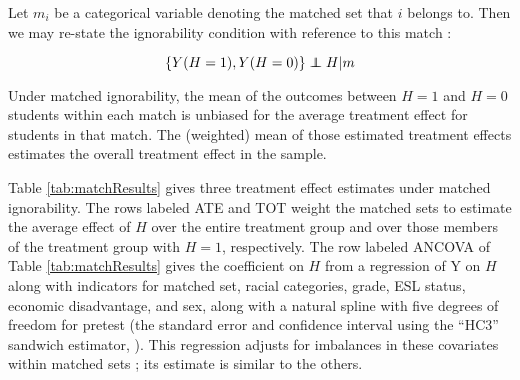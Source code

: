 \documentclass{article}\usepackage[]{graphicx}\usepackage[]{color}
\newenvironment{ass}[2][Assumption:]{\begin{trivlist}
\item[\hskip \labelsep {\bfseries #1}\hskip \labelsep {\bfseries #2}.]}{\end{trivlist}}
\def\independenT#1#2{\mathrel{\rlap{$#1#2$}\mkern2mu{#1#2}}}
\newcommand\independent{\protect\mathpalette{\protect\independenT}{\perp}}
\begin{document}
Let $m_i$ be a categorical variable denoting the matched set that $i$
belongs to.
Then we may re-state the ignorability condition with reference to this
match \citep[c.f.][]{rebar}:
\begin{ass}{Matched Ignorability}
\begin{equation*}
 \{Y(H=1),Y(H=0)\}\independent H |m
\end{equation*}
\end{ass}
Under matched ignorability, the mean of the outcomes between $H=1$ and
$H=0$ students within each match is unbiased for the average treatment
effect for students in that match.
The (weighted) mean of those estimated treatment effects estimates the
overall treatment effect in the sample.

Table \ref{tab:matchResults} gives three treatment effect estimates
under matched ignorability.
The rows labeled ATE and TOT weight the matched sets to
estimate the average effect of $H$ over the entire treatment
group and over those members of the treatment group with $H=1$,
respectively.
The row labeled ANCOVA of Table \ref{tab:matchResults} gives the
coefficient on $H$ from a regression of Y on $H$ along with indicators for matched set,
racial categories, grade, ESL status, economic disadvantage, and sex,
along with a natural spline with five degrees of freedom for pretest (the standard error
and confidence interval using the ``HC3'' sandwich estimator,
\citealt{sandwichPackage}).
This regression adjusts for imbalances in these covariates within
matched sets \citep[c.f.][]{biasAdjust}; its estimate is similar to
the others.
\end{document}

